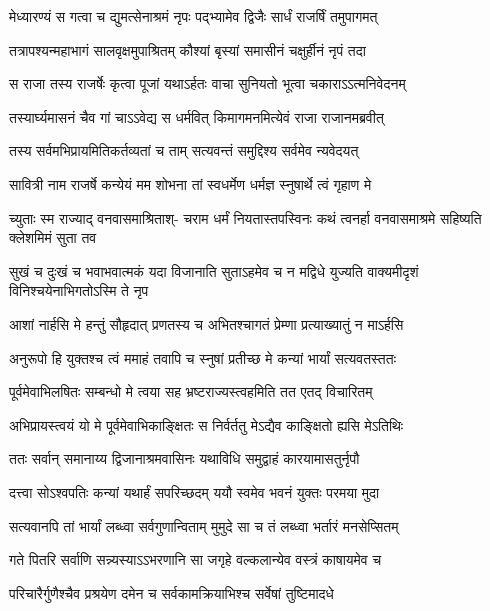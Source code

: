 \begin{center}
\twolineshloka
{मेध्यारण्यं स गत्वा च द्युमत्सेनाश्रमं नृपः}
{पद्भ्यामेव द्विजैः सार्धं राजर्षिं तमुपागमत्}

\twolineshloka
{तत्रापश्यन्महाभागं सालवृक्षमुपाश्रितम्}
{कौश्यां बृस्यां समासीनं चक्षुर्हीनं नृपं तदा}

\twolineshloka
{स राजा तस्य राजर्षेः कृत्वा पूजां यथाऽर्हतः}
{वाचा सुनियतो भूत्वा चकाराऽऽत्मनिवेदनम्}

\twolineshloka
{तस्यार्घ्यमासनं चैव गां चाऽऽवेद्य स धर्मवित्}
{किमागमनमित्येवं राजा राजानमब्रवीत्}

\twolineshloka
{तस्य सर्वमभिप्रायमितिकर्तव्यतां च ताम्}
{सत्यवन्तं समुद्दिश्य सर्वमेव न्यवेदयत्}

\twolineshloka
{सावित्री नाम राजर्षे कन्येयं मम शोभना}
{तां स्वधर्मेण धर्मज्ञ स्नुषार्थे त्वं गृहाण मे}


\fourlineindentedshloka
{च्युताः स्म राज्याद् वनवासमाश्रिताश्-}
{चराम धर्मं नियतास्तपस्विनः}
{कथं त्वनर्हा वनवासमाश्रमे}
{सहिष्यति क्लेशमिमं सुता तव}


\fourlineindentedshloka
{सुखं च दुःखं च भवाभवात्मकं}
{यदा विजानाति सुताऽहमेव च}
{न मद्विधे युज्यति वाक्यमीदृशं}
{विनिश्चयेनाभिगतोऽस्मि ते नृप}

\twolineshloka
{आशां नार्हसि मे हन्तुं सौहृदात् प्रणतस्य च}
{अभितश्चागतं प्रेम्णा प्रत्याख्यातुं न माऽर्हसि}

\twolineshloka
{अनुरूपो हि युक्तश्च त्वं ममाहं तवापि च}
{स्नुषां प्रतीच्छ मे कन्यां भार्यां सत्यवतस्ततः}


\twolineshloka
{पूर्वमेवाभिलषितः सम्बन्धो मे त्वया सह}
{भ्रष्टराज्यस्त्वहमिति तत एतद् विचारितम्}

\twolineshloka
{अभिप्रायस्त्वयं यो मे पूर्वमेवाभिकाङ्क्षितः}
{स निर्वर्ततु मेऽद्यैव काङ्क्षितो ह्यसि मेऽतिथिः}

\twolineshloka
{ततः सर्वान् समानाय्य द्विजानाश्रमवासिनः}
{यथाविधि समुद्वाहं कारयामासतुर्नृपौ}

\twolineshloka
{दत्त्वा सोऽश्वपतिः कन्यां यथार्हं सपरिच्छदम्}
{ययौ स्वमेव भवनं युक्तः परमया मुदा}

\twolineshloka
{सत्यवानपि तां भार्यां लब्ध्वा सर्वगुणान्विताम्}
{मुमुदे सा च तं लब्ध्वा भर्तारं मनसेप्सितम्}

\twolineshloka
{गते पितरि सर्वाणि सन्न्यस्याऽऽभरणानि सा}
{जगृहे वल्कलान्येव वस्त्रं काषायमेव च}

\twolineshloka
{परिचारैर्गुणैश्चैव प्रश्रयेण दमेन च}
{सर्वकामक्रियाभिश्च सर्वेषां तुष्टिमादधे}


\end{center}
